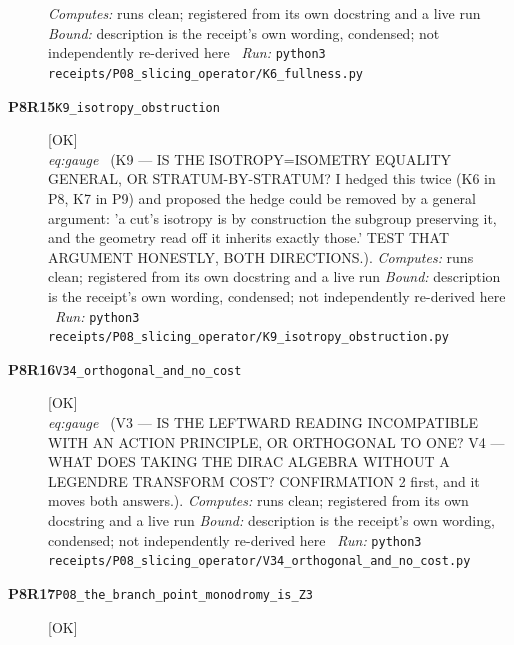 \begin{description}
\emph{Computes:} runs clean; registered from its own docstring and a live run
 \emph{Bound:} description is the receipt's own wording, condensed; not independently re-derived here
\ \emph{Run:} \texttt{python3 receipts/P08\_slicing\_operator/K6\_fullness.py}
\item[\rcptlabel{K9_isotropy_obstruction}{P8R15}\textbf{P8R15}\quad\texttt{K9\_isotropy\_obstruction}]\hfill\textsf{[OK]}\\
\textit{eq:gauge} \ (K9 --- IS THE ISOTROPY=ISOMETRY EQUALITY GENERAL, OR STRATUM-BY-STRATUM? I hedged this twice (K6 in P8, K7 in P9) and proposed the hedge could be removed by a general argument: 'a cut's isotropy is by construction the subgroup preserving it, and the geometry read off it inherits exactly those.' TEST THAT ARGUMENT HONESTLY, BOTH DIRECTIONS.). 
\emph{Computes:} runs clean; registered from its own docstring and a live run
 \emph{Bound:} description is the receipt's own wording, condensed; not independently re-derived here
\ \emph{Run:} \texttt{python3 receipts/P08\_slicing\_operator/K9\_isotropy\_obstruction.py}
\item[\rcptlabel{V34_orthogonal_and_no_cost}{P8R16}\textbf{P8R16}\quad\texttt{V34\_orthogonal\_and\_no\_cost}]\hfill\textsf{[OK]}\\
\textit{eq:gauge} \ (V3 --- IS THE LEFTWARD READING INCOMPATIBLE WITH AN ACTION PRINCIPLE, OR ORTHOGONAL TO ONE? V4 --- WHAT DOES TAKING THE DIRAC ALGEBRA WITHOUT A LEGENDRE TRANSFORM COST? CONFIRMATION 2 first, and it moves both answers.). 
\emph{Computes:} runs clean; registered from its own docstring and a live run
 \emph{Bound:} description is the receipt's own wording, condensed; not independently re-derived here
\ \emph{Run:} \texttt{python3 receipts/P08\_slicing\_operator/V34\_orthogonal\_and\_no\_cost.py}
\item[\rcptlabel{P08_the_branch_point_monodromy_is_Z3}{P8R17}\textbf{P8R17}\quad\texttt{P08\_the\_branch\_point\_monodromy\_is\_Z3}]\hfill\textsf{[OK]}\\

\end{description}

